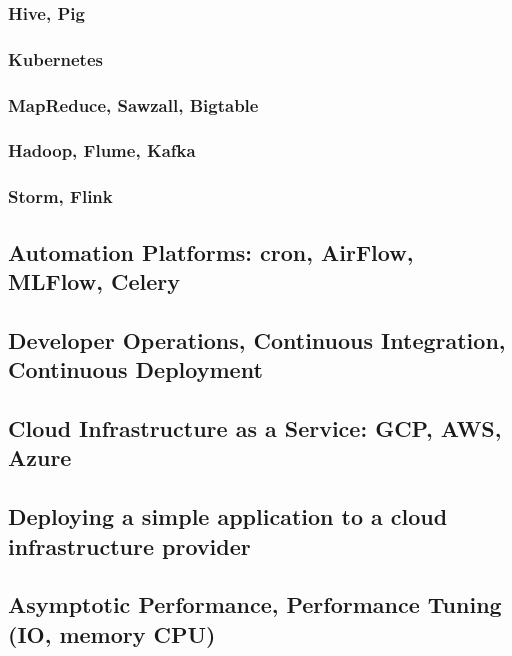   \subsubsection{Hive, Pig}
  \subsubsection{Kubernetes}
  \subsubsection{MapReduce, Sawzall, Bigtable}
  \subsubsection{Hadoop, Flume, Kafka}
  \subsubsection{Storm, Flink}

\subsection{Automation Platforms: cron, AirFlow, MLFlow, Celery}

\subsection{Developer Operations, Continuous Integration, Continuous Deployment}

\subsection{Cloud Infrastructure as a Service: GCP, AWS, Azure}

\subsection{Deploying a simple application to a cloud infrastructure provider}

\subsection{Asymptotic Performance, Performance Tuning (IO, memory CPU)}
